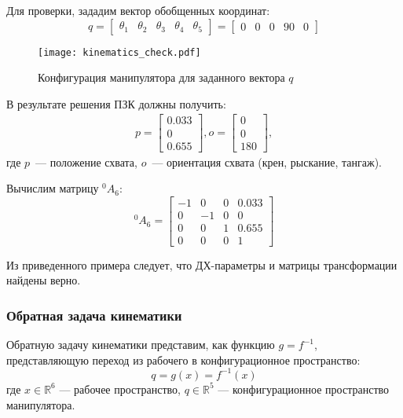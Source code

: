 Для проверки, зададим вектор обобщенных координат:
\begin{equation}
	q =
	\begin{bmatrix}
	\theta_1 & \theta_2 & \theta_3 & \theta_4 & \theta_5
	\end{bmatrix}
	=
	\begin{bmatrix}
	0 & 0 & 0 & 90 & 0
	\end{bmatrix}
\end{equation}

\begin{figure}[h]
	\centering
	\texttt{[image: kinematics\_check.pdf]}
	\caption{Конфигурация манипулятора для заданного вектора $q$}
	\label{kinematics_check}
\end{figure}

В результате решения ПЗК должны получить:
\begin{align*}
	p = 
	\begin{bmatrix}
		0.033\\
		0\\
		0.655 
	\end{bmatrix},
	o =
	\begin{bmatrix}
		0\\
		0\\
		180
	\end{bmatrix}, 
\end{align*}
где $p$~--- положение схвата, $o$~--- ориентация схвата (крен, рыскание, тангаж).

Вычислим матрицу $^0A_6$:
\begin{equation}
	^0A_6 = 
	\left[\begin{matrix}-1 & 0 & 0 & 0.033\\0 & -1 & 0 & 0\\0 & 0 & 1 & 0.655\\0 & 0 & 0 & 1\end{matrix}\right]
\end{equation}

Из приведенного примера следует, что ДХ-параметры и матрицы трансформации найдены верно.

\subsubsection{Обратная задача кинематики}\label{part_kinematics_inverse}
Обратную задачу кинематики представим, как функцию $g = f^{-1}$, представляющую переход из рабочего в конфигурационное пространство:
\begin{equation}
q = g(x) = f^{-1}(x)
\end{equation}
где $x \in \mathbb{R}^6$ --- рабочее пространство, $q \in \mathbb{R}^5$ --- конфигурационное пространство манипулятора.
\fi

